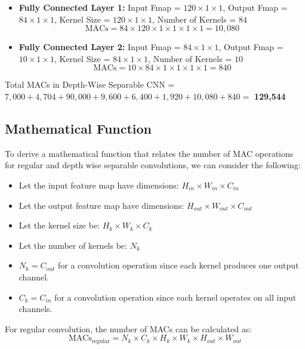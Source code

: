 \documentclass{article}
\begin{document}
\begin{itemize}
    \item \textbf{Fully Connected Layer 1:} Input Fmap = $120 \times 1 \times 1$, Output Fmap = $84 \times 1 \times 1$, Kernel Size = $120 \times 1 \times 1$, Number of Kernels = $84$
    \begin{equation}
        \text{MACs} = 84 \times 120 \times 1 \times 1 \times 1 \times 1 = 10,080
    \end{equation}
    
    \item \textbf{Fully Connected Layer 2:} Input Fmap = $84 \times 1 \times 1$, Output Fmap = $10 \times 1 \times 1$, Kernel Size = $84 \times 1 \times 1$, Number of Kernels = $10$
    \begin{equation}
        \text{MACs} = 10 \times 84 \times 1 \times 1 \times 1 \times 1 = 840
    \end{equation}
\end{itemize}

Total MACs in Depth-Wise Separable CNN = $7,000 + 4,704 + 90,000 + 9,600 + 6,400 + 1,920 + 10,080 + 840 =$ \textbf{129,544}

\subsection{Mathematical Function}

To derive a mathematical function that relates the number of MAC operations for regular and depth wise separable convolutions, we can consider the following:

\begin{itemize}
    \item Let the input feature map have dimensions: $H_{in} \times W_{in} \times C_{in}$
    \item Let the output feature map have dimensions: $H_{out} \times W_{out} \times C_{out}$
    \item Let the kernel size be: $H_k \times W_k \times C_k$
    \item Let the number of kernels be: $N_k$
    \item $N_k = C_{out}$ for a convolution operation since each kernel produces one output channel.
    \item $C_k = C_{in}$ for a convolution operation since each kernel operates on all input channels.
\end{itemize}

For regular convolution, the number of MACs can be calculated as:
\begin{equation}
    \text{MACs}_{\text{regular}} = N_k \times C_k \times H_k \times W_k \times H_{out} \times W_{out}
\end{equation}
\end{document}

